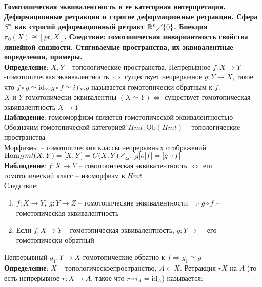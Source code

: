 \newpage
\section{}	
	\textbf{Гомотопическая эквивалентность и ее категорная интерпретация. Деформационные ретракции и строгие деформационные ретракции. Сфера $S^n$ как строгий деформационный ретракт $\mathbb{R}^n \diagup \{0\}$. Биекция ${\pi}_0 (X) \cong [pt, X]$. Следствие: гомотопическая инвариантность свойства линейной связности. Стягиваемые пространства, их эквивалентные определения, примеры.}\\
	\textbf{Определение}: $X, Y$ -- топологические пространства. Непрерывное $f: X \rightarrow Y$ -гомотопическая эквивалентность $\Leftrightarrow$ существует непрерывное $g: Y \rightarrow X$, такое что $f \circ g \simeq  \text{id}_Y, g \circ f \simeq if_X. g$ называется гомотопически обратным к $f$.\\
	$X$ и $Y$ гомотопически эквивалентны $(X\simeq Y) \Leftrightarrow$ существует гомотопическая эквивалентность $X\rightarrow Y$\\
	\textbf{Наблюдение}: гомеоморфизм является гомотопической эквивалентностью\\
	Обозначим гомотопической категорией $Hmt: \text{Ob}(Hmt)$ -- топологические пространства\\
	Морфизмы -- гомотопические классы непрерывных отображений $\text{Hom}_Hmt (X,Y) = [X,Y] = {C(X,Y)\diagup}_{\simeq}, [g]o[f] = [g \circ f]$\\
	\textbf{Наблюдение}: $f: X\rightarrow Y$ -- гомотопическая эквивалентность $\Leftrightarrow$ его гомотопический класс -- изоморфизм в $Hmt$\\
	Следствие: 
	\begin{enumerate}
		\item $f: X\rightarrow Y,\ g: Y \rightarrow Z$ -- гомотопические эквивалентности $\Rightarrow g \circ f$ -- гомотопическая эквивалентность
		\item Если $f: X\rightarrow Y$ -- гомотопическая эквивалентность, $g: Y\rightarrow$ -- его гомотопически обратный	
	\end{enumerate}
	Непрерывный $g_1: Y \rightarrow X$ гомотопические обратно к $f \Rightarrow g_1 \simeq g$\\
	\textbf{Определение}: $X$ -- топологическоепространство, $A\subset X$. Ретракция $r X$ на $A$ (то есть непрерывное $r: X\rightarrow A$, такое что $r \circ i_A =  \text{id}_A$) называется:\\
